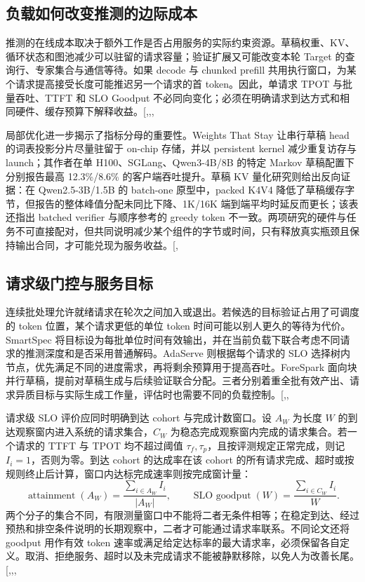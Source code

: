 \documentclass[
  a4paper,
  UTF8,
  fontset=none,
  zihao=5]{ctexart}
\begin{document}
\subsection{负载如何改变推测的边际成本}\label{serving-cost}

推测的在线成本取决于额外工作是否占用服务的实际约束资源。草稿权重、KV、循环状态和图池减少可以驻留的请求容量；验证扩展又可能改变本轮
Target 的查询行、专家集合与通信等待。如果 decode 与 chunked prefill
共用执行窗口，为某个请求提高接受长度可能推迟另一个请求的首
token。因此，单请求 TPOT 与批量吞吐、TTFT 和 SLO Goodput
不必同向变化；必须在明确请求到达方式和相同硬件、缓存预算下解释收益。{[},,,\citeproc{ref-adaserve}{24}{]}

局部优化进一步揭示了指标分母的重要性。Weights That Stay 让串行草稿 head
的词表投影分片尽量驻留于 on-chip 存储，并以 persistent kernel
减少重复访存与 launch；其作者在单 H100、SGLang、Qwen3-4B/8B 的特定
Markov 草稿配置下分别报告最高 12.3\%/8.6\% 的客户端吞吐提升。草稿 KV
量化研究则给出反向证据：在 Qwen2.5-3B/1.5B 的 batch-one 原型中，packed
K4V4 降低了草稿缓存字节，但报告的整体峰值分配未同比下降、1K/16K
端到端平均时延反而更长；该表还指出 batched verifier 与顺序参考的 greedy
token
不一致。两项研究的硬件与任务不可直接配对，但共同说明减少某个组件的字节或时间，只有释放真实瓶颈且保持输出合同，才可能兑现为服务收益。{[},\citeproc{ref-draftkv}{72}{]}

\subsection{请求级门控与服务目标}\label{online-control}

连续批处理允许就绪请求在轮次之间加入或退出。若候选的目标验证占用了可调度的
token 位置，某个请求更低的单位 token
时间可能以别人更久的等待为代价。SmartSpec
将目标设为每批单位时间有效输出，并在当前负载下联合考虑不同请求的推测深度和是否采用普通解码。AdaServe
则根据每个请求的 SLO
选择树内节点，优先满足不同的进度需求，再将剩余预算用于提高吞吐。ForeSpark
面向块并行草稿，提前对草稿生成与后续验证联合分配。三者分别着重全批有效产出、请求异质目标与实际生成工作量，评估时也需要不同的负载控制。{[},,\citeproc{ref-adaserve}{24}{]}

请求级 SLO 评价应同时明确到达 cohort 与完成计数窗口。设 \(A_W\) 为长度
\(W\) 的到达观察窗内进入系统的请求集合，\(C_W\)
为稳态完成观察窗内完成的请求集合。若一个请求的 TTFT 与 TPOT 均不超过阈值
\(\tau_f,\tau_p\)，且按评测规定正常完成，则记 \(I_i=1\)，否则为零。到达
cohort 的达成率在该 cohort
的所有请求完成、超时或按规则终止后计算，窗口内达标完成速率则按完成窗计量：
\[
\operatorname{attainment}(A_W)=\frac{\sum_{i\in A_W}I_i}{|A_W|},
\qquad
\operatorname{SLO\ goodput}(W)=\frac{\sum_{i\in C_W}I_i}{W}.
\]
两个分子的集合不同，有限测量窗口中不能将二者无条件相等；在稳定到达、经过预热和排空条件说明的长期观察中，二者才可能通过请求率联系。不同论文还将
goodput 用作有效 token
速率或满足给定达标率的最大请求率，必须保留各自定义。取消、拒绝服务、超时以及未完成请求不能被静默移除，以免人为改善长尾。{[},,,\citeproc{ref-distserve}{73}{]}
\end{document}
